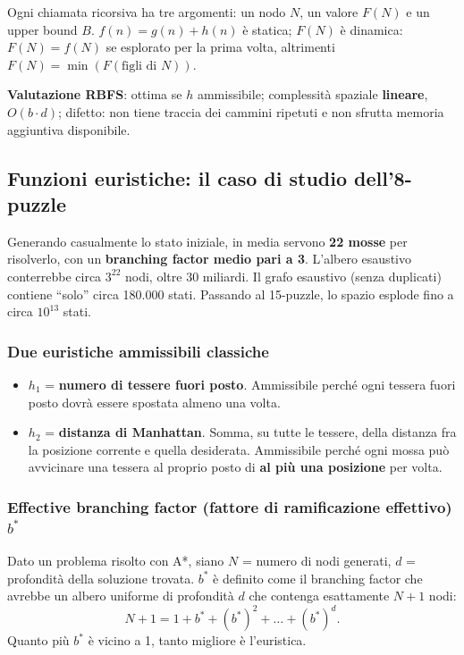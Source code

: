 \documentclass[11pt,a4paper]{report}
\begin{document}
Ogni chiamata ricorsiva ha tre argomenti: un nodo $N$, un valore $F(N)$ e un upper bound $B$. $f(n)=g(n)+h(n)$ è statica; $F(N)$ è dinamica: $F(N)=f(N)$ se esplorato per la prima volta, altrimenti $F(N)=\min(F(\text{figli di }N))$.

\textbf{Valutazione RBFS}: ottima se $h$ ammissibile; complessità spaziale \textbf{lineare}, $O(b\cdot d)$; difetto: non tiene traccia dei cammini ripetuti e non sfrutta memoria aggiuntiva disponibile.

\subsection{Funzioni euristiche: il caso di studio dell'8-puzzle}

Generando casualmente lo stato iniziale, in media servono \textbf{22 mosse} per risolverlo, con un \textbf{branching factor medio pari a 3}. L'albero esaustivo conterrebbe circa $3^{22}$ nodi, oltre 30 miliardi. Il grafo esaustivo (senza duplicati) contiene ``solo'' circa 180.000 stati. Passando al 15-puzzle, lo spazio esplode fino a circa $10^{13}$ stati.

\subsubsection*{Due euristiche ammissibili classiche}

\begin{itemize}
  \item $h_1$ = \textbf{numero di tessere fuori posto}. Ammissibile perché ogni tessera fuori posto dovrà essere spostata almeno una volta.
  \item $h_2$ = \textbf{distanza di Manhattan}. Somma, su tutte le tessere, della distanza fra la posizione corrente e quella desiderata. Ammissibile perché ogni mossa può avvicinare una tessera al proprio posto di \textbf{al più una posizione} per volta.
\end{itemize}

\subsubsection*{Effective branching factor (fattore di ramificazione effettivo) $b^*$}

Dato un problema risolto con A*, siano $N$ = numero di nodi generati, $d$ = profondità della soluzione trovata. $b^*$ è definito come il branching factor che avrebbe un albero uniforme di profondità $d$ che contenga esattamente $N+1$ nodi:
\[
N+1 = 1+b^*+(b^*)^2+\dots+(b^*)^d.
\]
Quanto più $b^*$ è vicino a 1, tanto migliore è l'euristica.
\end{document}
